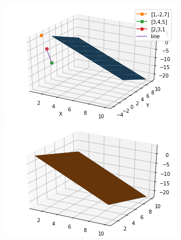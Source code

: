 \documentclass[10pt,a4paper,twocolumn]{article}
\numberwithin{equation}{section}
\begin{document}
\includegraphics{Figure_3}
\includegraphics{Figure_4}






\end{document}
